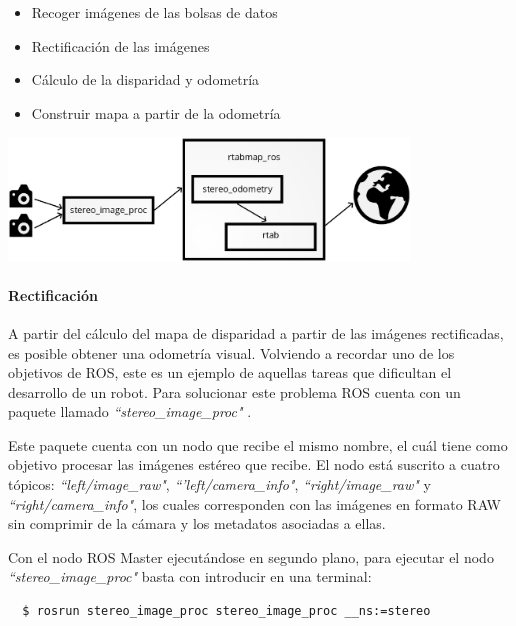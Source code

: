 \begin{itemize}
  \item Recoger imágenes de las bolsas de datos
  \item Rectificación de las imágenes
  \item Cálculo de la disparidad y odometría
  \item Construir mapa a partir de la odometría
\end{itemize}

\begin{minipage}{\linewidth}
    \centering
    \includegraphics[width=0.8\textwidth]{images/cap4/Carro-esquema.eps}
    \label{fig:Carro-esquema}
\end{minipage}

\paragraph{Rectificación} \hspace{0pt}

A partir del cálculo del mapa de disparidad a partir de las imágenes
rectificadas, es posible obtener una odometría visual. Volviendo a recordar uno
de los objetivos de ROS, este es un ejemplo de aquellas tareas que dificultan el
desarrollo de un robot. Para solucionar este problema ROS cuenta con un paquete
llamado \textit{``stereo\_image\_proc"} \cite{PackageStereoImageProc}.

Este paquete cuenta con un nodo que recibe el mismo nombre, el cuál tiene como
objetivo procesar las imágenes estéreo que recibe. El nodo está suscrito a
cuatro tópicos: \textit{``left/image\_raw"}, \textit{``'left/camera\_info"},
\textit{``right/image\_raw"} y \textit{``right/camera\_info"}, los cuales
corresponden con las imágenes en formato RAW sin comprimir de la cámara y los
metadatos asociadas a ellas.

Con el nodo ROS Master ejecutándose en segundo plano, para ejecutar el nodo
\textit{``stereo\_image\_proc"} basta con introducir en una terminal:
\\
\begin{lstlisting}
  $ rosrun stereo_image_proc stereo_image_proc __ns:=stereo
\end{lstlisting}

